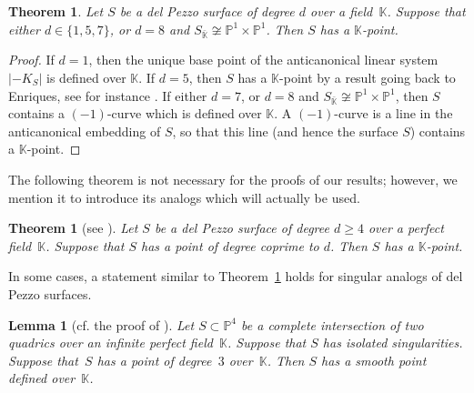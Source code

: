 \documentclass[12pt]{amsart}
\newcounter{cequation}[section]
\newtheorem{theorem}[cequation]{Theorem}
\newtheorem{lemma}[cequation]{Lemma}
\theoremstyle{definition}
\theoremstyle{remark}
\newcommand{\PP}{\mathbb{P}}
\newcommand{\KK}{\mathbb{K}}
\def \ge {\geqslant}
\begin{document}
\begin{theorem}
\label{theorem:dP-with-points}
Let $S$ be a del Pezzo
surface of degree $d$ over a field~$\KK$.
Suppose that either $d\in\{1,5,7\}$, or $d=8$ and $S_{\bar{\KK}}\not\cong\PP^1\times\PP^1$.
Then $S$ has a $\KK$-point.
\end{theorem}
\begin{proof}
If $d=1$, then the unique base point of the anticanonical linear system $|-K_S|$ is defined over $\KK$.
If $d=5$, then $S$ has a $\KK$-point by
a result going back to Enriques, see for instance \cite[Theorem~2.5]{VA}.
If either $d=7$, or $d=8$ and $S_{\bar{\KK}}\not\cong\PP^1\times\PP^1$, then
$S$ contains a $(-1)$-curve which is defined over $\KK$.
A $(-1)$-curve is a line in the anticanonical embedding of $S$,
so that this line (and hence the surface $S$) contains a $\KK$-point.
\end{proof}


The following theorem is not necessary for the proofs of our results;
however, we mention it to introduce its analogs which
will actually be used.

\begin{theorem}[{see \cite{Coray}}]
\label{theorem:Coray}
Let $S$ be a del Pezzo
surface of degree $d\ge 4$ over a perfect field~$\KK$.
Suppose that $S$ has a point of degree coprime to $d$.
Then $S$ has a $\KK$-point.
\end{theorem}

In some cases, a statement similar to Theorem~\ref{theorem:Coray}
holds for singular analogs of del Pezzo surfaces.

\begin{lemma}[{cf. the proof of \cite[Lemma~2.4]{Shramov-Cubics}}]
\label{lemma:singular-dP-4}
Let $S\subset\PP^4$ be a complete intersection of two quadrics
over an infinite perfect field~$\KK$.
Suppose that $S$ has isolated singularities.
Suppose that~$S$
has a point of degree~$3$ over~$\KK$. Then $S$ has a smooth point defined over~$\KK$.
\end{lemma}
\end{document}

